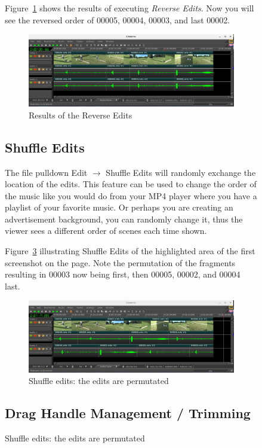 \begin{figure}
Figure~\ref{fig:reverse02} shows the results of executing \textit{Reverse Edits}.  Now you will see the reversed order of 00005, 00004, 00003, and last 00002.
\begin{figure}[htpb]
    \centering
    \includegraphics[width=0.8\linewidth]{images/reverse02.png}
    \caption{Results of the Reverse Edits}
    \label{fig:reverse02}
\end{figure}

\subsection{Shuffle Edits}%
\label{sub:shuffle_edits}
 
The file pulldown Edit $\rightarrow$ Shuffle Edits will randomly exchange the location of the edits.  This feature can be used to change the order of the music like you would do from your MP4 player where you have a playlist of your favorite music.  Or perhaps you are creating an advertisement background, you can randomly change it, thus the viewer sees a different order of scenes each time shown.

Figure~\ref{fig:shuffle} illustrating Shuffle Edits of the highlighted area of the first screenshot on the page.  Note the permutation of the fragments resulting in 00003 now being first, then 00005, 00002, and 00004 last.
\begin{figure}[htpb]
    \centering
    \includegraphics[width=0.8\linewidth]{images/shuffle.png}
    \caption{Shuffle edits: the edits are permutated}
    \label{fig:shuffle}
\end{figure}

\subsection{Drag Handle Management / Trimming}%
\label{sub:drag_handle_management_trimming}


\end{figure}
